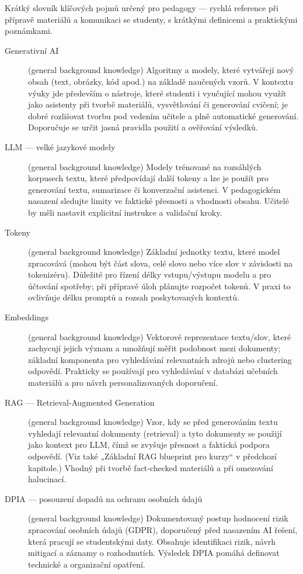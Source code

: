 Krátký slovník klíčových pojmů určený pro pedagogy — rychlá reference při přípravě materiálů a komunikaci se studenty, s krátkými definicemi a praktickými poznámkami.

\begin{description}
  \item[Generativní AI] (general background knowledge) Algoritmy a modely, které vytvářejí nový obsah (text, obrázky, kód apod.) na základě naučených vzorů. V kontextu výuky jde především o nástroje, které studenti i vyučující mohou využít jako asistenty při tvorbě materiálů, vysvětlování či generování cvičení; je dobré rozlišovat tvorbu pod vedením učitele a plně automatické generování. Doporučuje se určit jasná pravidla použití a ověřování výsledků.
  \item[LLM — velké jazykové modely] (general background knowledge) Modely trénované na rozsáhlých korpusech textu, které předpovídají další tokeny a lze je použít pro generování textu, sumarizace či konverzační asistenci. V pedagogickém nasazení sledujte limity ve faktické přesnosti a vhodnosti obsahu. Učitelé by měli nastavit explicitní instrukce a validační kroky.
  \item[Tokeny] (general background knowledge) Základní jednotky textu, které model zpracovává (mohou být část slova, celé slovo nebo více slov v závislosti na tokenizéru). Důležité pro řízení délky vstupu/výstupu modelu a pro účtování spotřeby; při přípravě úloh plánujte rozpočet tokenů. V praxi to ovlivňuje délku promptů a rozsah poskytovaných kontextů.
  \item[Embeddings] (general background knowledge) Vektorové reprezentace textu/slov, které zachycují jejich význam a umožňují měřit podobnost mezi dokumenty; základní komponenta pro vyhledávání relevantních zdrojů nebo clustering odpovědí. Prakticky se používají pro vyhledávání v databázi učebních materiálů a pro návrh personalizovaných doporučení.
  \item[RAG — Retrieval‑Augmented Generation] (general background knowledge) Vzor, kdy se před generováním textu vyhledají relevantní dokumenty (retrieval) a tyto dokumenty se použijí jako kontext pro LLM, čímž se zvyšuje přesnost a faktická podpora odpovědí. (Viz také „Základní RAG blueprint pro kurzy“ v předchozí kapitole.) Vhodný při tvorbě fact‑checked materiálů a při omezování halucinací.
  \item[DPIA — posouzení dopadů na ochranu osobních údajů] (general background knowledge) Dokumentovaný postup hodnocení rizik zpracování osobních údajů (GDPR), doporučený před nasazením AI řešení, která pracují se studentskými daty. Obsahuje identifikaci rizik, návrh mitigací a záznamy o rozhodnutích. Výsledek DPIA pomáhá definovat technické a organizační opatření.

\end{description}
